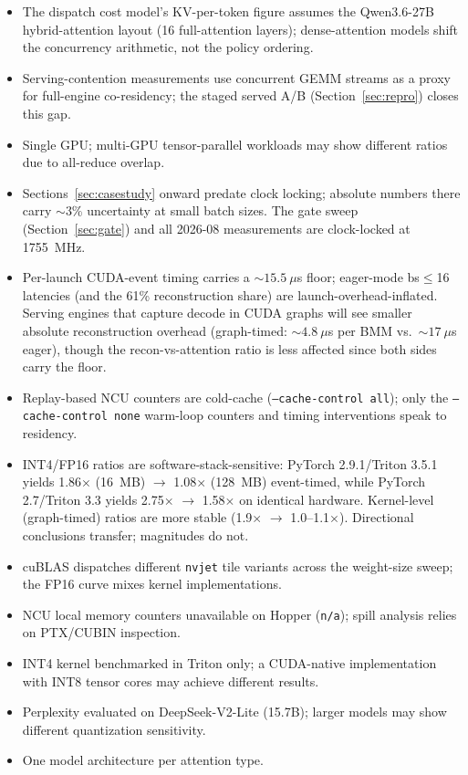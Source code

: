 \documentclass[10pt,twocolumn]{article}
\begin{document}
\begin{itemize}[leftmargin=*,topsep=0pt]
  \item The dispatch cost model's KV-per-token figure assumes the Qwen3.6-27B hybrid-attention layout (16 full-attention layers); dense-attention models shift the concurrency arithmetic, not the policy ordering.
  \item Serving-contention measurements use concurrent GEMM streams as a proxy for full-engine co-residency; the staged served A/B (Section~\ref{sec:repro}) closes this gap.
  \item Single GPU; multi-GPU tensor-parallel workloads may show different ratios due to all-reduce overlap.
  \item Sections~\ref{sec:casestudy} onward predate clock locking; absolute numbers there carry $\sim$3\% uncertainty at small batch sizes.  The gate sweep (Section~\ref{sec:gate}) and all 2026-08 measurements are clock-locked at 1755~MHz.
  \item Per-launch CUDA-event timing carries a ${\sim}15.5~\mu$s floor; eager-mode bs$\leq$16 latencies (and the 61\% reconstruction share) are launch-overhead-inflated.  Serving engines that capture decode in CUDA graphs will see smaller absolute reconstruction overhead (graph-timed: ${\sim}4.8~\mu$s per BMM vs.\ ${\sim}17~\mu$s eager), though the recon-vs-attention ratio is less affected since both sides carry the floor.
  \item Replay-based NCU counters are cold-cache (\texttt{--cache-control all}); only the \texttt{--cache-control none} warm-loop counters and timing interventions speak to residency.
  \item INT4/FP16 ratios are software-stack-sensitive: PyTorch 2.9.1/Triton 3.5.1 yields 1.86$\times$ (16~MB) $\to$ 1.08$\times$ (128~MB) event-timed, while PyTorch 2.7/Triton 3.3 yields 2.75$\times$ $\to$ 1.58$\times$ on identical hardware.  Kernel-level (graph-timed) ratios are more stable (1.9$\times$ $\to$ 1.0--1.1$\times$).  Directional conclusions transfer; magnitudes do not.
  \item cuBLAS dispatches different \texttt{nvjet} tile variants across the weight-size sweep; the FP16 curve mixes kernel implementations.
  \item NCU local memory counters unavailable on Hopper (\texttt{n/a}); spill analysis relies on PTX/CUBIN inspection.
  \item INT4 kernel benchmarked in Triton only; a CUDA-native implementation with INT8 tensor cores may achieve different results.
  \item Perplexity evaluated on DeepSeek-V2-Lite (15.7B); larger models may show different quantization sensitivity.
  \item One model architecture per attention type.
\end{itemize}
\end{document}
